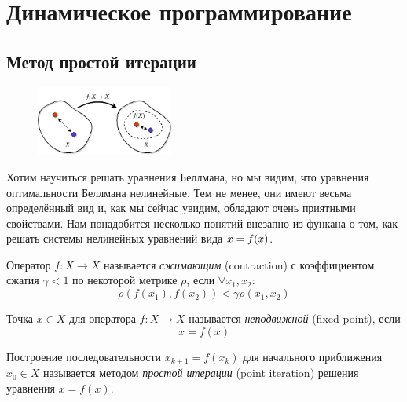 \section{Динамическое программирование}\label{valueiterationsection}

\subsection{Метод простой итерации}

\begin{figure}
\vspace{-1cm}
\centering
\includegraphics[width=0.4\textwidth]{Images/ContractionMapping.png}
\vspace{-1cm}
\end{figure}

Хотим научиться решать уравнения Беллмана, но мы видим, что уравнения оптимальности Беллмана нелинейные. Тем не менее, они имеют весьма определённый вид и, как мы сейчас увидим, обладают очень приятными свойствами. Нам понадобится несколько понятий внезапно из функана о том, как решать системы нелинейных уравнений вида $x \HM= f(x)$.

\begin{definition}
Оператор $f \colon X \to X$ называется \emph{сжимающим} (contraction) с коэффициентом сжатия $\gamma < 1$ по некоторой метрике $\rho$, если $\forall x_1, x_2 \colon$
$$\rho(f(x_1), f(x_2)) < \gamma \rho(x_1, x_2)$$
\end{definition}

\begin{definition}
Точка $x \in X$ для оператора $f \colon X \to X$ называется \emph{неподвижной} (fixed point), если
$$x = f(x)$$
\end{definition}

\begin{definition}
Построение последовательности $x_{k+1} = f(x_k)$ для начального приближения $x_0 \in X$ называется методом \emph{простой итерации} (point iteration) решения уравнения $x = f(x)$.
\end{definition}

